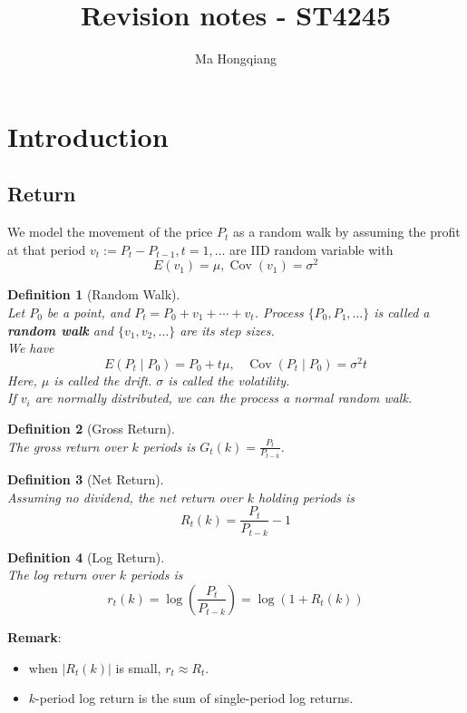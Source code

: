 \documentclass[12pt]{article}
\newtheorem{definition}{Definition}[section]
\theoremstyle{definition}
\DeclareMathOperator{\cov}{Cov}
\begin{document}
\title{Revision notes - ST4245}
\author{Ma Hongqiang}
\maketitle
\tableofcontents

\clearpage
\section{Introduction}
\subsection{Return}
We model the movement of the price $P_t$ as a random walk by assuming the profit at that period $v_t:= P_t -P_{t-1}, t= 1,\ldots$ are IID random variable with 
\[
E(v_1) = \mu, \cov(v_1)= \sigma^2
\] 
\begin{definition}[Random Walk]
\hfill\\\normalfont Let $P_0$ be a point, and $P_t= P_0 + v_1 + \cdots + v_t$. Process $\{P_0, P_1, \ldots\}$ is called a \textbf{random walk} and $\{v_1, v_2,\ldots\}$ are its step sizes.\\
We have 
\[
E(P_t\mid P_0) = P_0 + t\mu,\;\;\;\cov(P_t\mid P_0)= \sigma^2 t
\]
Here, $\mu$ is called the drift. $\sigma$ is called the volatility.\\
If $v_i$ are normally distributed, we can the process a \textit{normal} random walk.\\ 
\end{definition}
\begin{definition}[Gross Return]
\hfill\\\normalfont The gross return over $k$ periods is $G_t(k) = \frac{P_t}{P_{t-k}}$.
\end{definition}
\begin{definition}[Net Return]
\hfill\\\normalfont Assuming no dividend, the net return over $k$ holding periods is
\[
R_t(k) = \frac{P_t}{P_{t-k}} - 1
\]
\end{definition}
\begin{definition}[Log Return]
\hfill\\\normalfont The log return over $k$ periods is
\[
r_t(k)=\log(\frac{P_t}{P_{t-k}})=\log(1+R_t(k))
\]
\end{definition}
\textbf{Remark}:
\begin{itemize}
  \item when $|R_t(k)|$ is small, $r_t\approx R_t$.
  \item $k$-period log return is the sum of single-period log returns.
\end{itemize}
\end{document}
